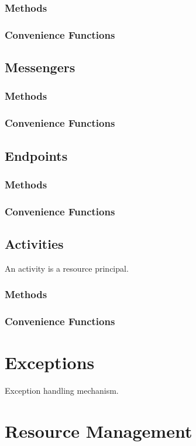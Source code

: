 \subsection{Methods}

\subsection{Convenience Functions}

\clearpage
\section{Messengers}

\subsection{Methods}

\subsection{Convenience Functions}

\clearpage
\section{Endpoints}

\subsection{Methods}

\subsection{Convenience Functions}

\clearpage
\section{Activities}

An activity is a resource principal.

\subsection{Methods}

\subsection{Convenience Functions}

\chapter{Exceptions}

Exception handling mechanism.

\chapter{Resource Management}

